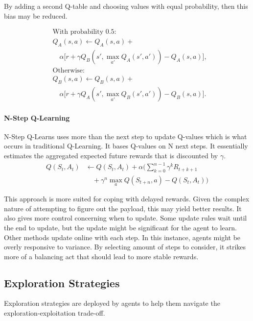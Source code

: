 \documentclass[conference]{IEEEtran}
\begin{document}
By adding a second Q-table and choosing values with equal probability, then this bias may be reduced.

\begin{equation}
\begin{split}
    &\text{With probability 0.5:} \\
    &Q_A(s, a) \leftarrow Q_A(s, a) + \\
    &\quad \alpha \big[ r + \gamma Q_B\left(s', \max_{a'} Q_A(s', a')\right) - Q_A(s, a) \big], \\
    &\text{Otherwise:} \\
    &Q_B(s, a) \leftarrow Q_B(s, a) + \\
    &\quad \alpha \big[ r + \gamma Q_A\left(s', \max_{a'} Q_B(s', a')\right) - Q_B(s, a) \big].
\end{split}
\end{equation}

\paragraph{N-Step Q-Learning}
N-Step Q-Learns uses more than the next step to update Q-values which is what occurs in traditional Q-Learning. It bases Q-values on N next steps. It essentially estimates the aggregated expected future rewards that is discounted by $\gamma$.  
\begin{equation}
\begin{aligned}
Q(S_t, A_t) & \leftarrow Q(S_t, A_t) + \alpha \Bigg( \sum_{k=0}^{n-1} \gamma^k R_{t+k+1} \\
            & \quad + \gamma^n \max_a Q(S_{t+n}, a) - Q(S_t, A_t) \Bigg)
\end{aligned}
\end{equation}

This approach is more suited for coping with delayed rewards. Given the complex nature of attempting to figure out the payload, this may yield better results. It also gives more control concerning when to update. Some update rules wait until the end to update, but the update might be significant for the agent to learn. Other methods update online with each step. In this instance, agents might be overly responsive to variance. By selecting amount of steps to consider, it strikes more of a balancing act that should lead to more stable rewards.  

\subsection{Exploration Strategies}
Exploration strategies are deployed by agents to help them navigate the exploration-exploitation trade-off. 
\end{document}
